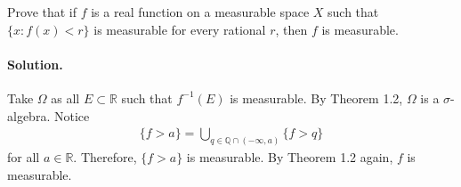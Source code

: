 \documentclass[../main.tex]{subfiles}
\begin{document}
\begin{exercise}
  Prove that if $ f$ is a real function on a measurable space $ X $ such that $ \{x: f(x) < r\} $ is measurable for every rational $ r $, then $ f $ is measurable.
  \paragraph{Solution. }
  Take $ \Omega $ as all $ E \subset \mathbb{R} $ such that $ f ^{-1}(E) $ is measurable. By Theorem 1.2, $ \Omega $ is a $ \sigma $-algebra. Notice
  \begin{align*}
    \{f > a\} = \bigcup _{q \in \mathbb{Q} \cap (-\infty, a)} \{f > q\}
  \end{align*}
  for all $ a \in \mathbb{R} $. Therefore, $ \{f > a\} $ is measurable. By Theorem 1.2 again, $ f $ is measurable.

\end{exercise}
\end{document}
